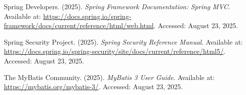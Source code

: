 \begin{thebibliography}{99}
    Spring Developers. (2025). \emph{Spring Framework Documentation: Spring MVC}. 
    Available at: \url{https://docs.spring.io/spring-framework/docs/current/reference/html/web.html}. 
    Accessed: August 23, 2025.

    Spring Security Project. (2025). \emph{Spring Security Reference Manual}. 
    Available at: \url{https://docs.spring.io/spring-security/site/docs/current/reference/html5/}. 
    Accessed: August 23, 2025.

    The MyBatis Community. (2025). \emph{MyBatis 3 User Guide}. 
    Available at: \url{https://mybatis.org/mybatis-3/}. 
    Accessed: August 23, 2025.

\end{thebibliography}
